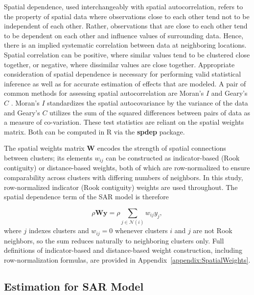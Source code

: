\documentclass{article}[11pt]
\begin{document}
Spatial dependence, used interchangeably with spatial autocorrelation, refers to the property of spatial data where observations close to each other tend not to be independent of each other. Rather, observations that are close to each other tend to be dependent on each other and influence values of surrounding data. Hence, there is an implied systematic correlation between data at neighboring locations. Spatial correlation can be positive, where similar values tend to be clustered close together, or negative, where dissimilar values are close together. Appropriate consideration of spatial dependence is necessary for performing valid statistical inference as well as for accurate estimation of effects that are modeled. A pair of common methods for assessing spatial autocorrelation are Moran's $\textit{I}$ \cite{moran_interpretation_1948}\cite{moran_notes_1950} and Geary's $\textit{C}$ \cite{geary_contiguity_1954}\cite{waller_applied_2004}. Moran's $\textit{I}$ standardizes the spatial autocovariance by the variance of the data and Geary's $\textit{C}$ utilizes the sum of the squared differences between pairs of data as a measure of co-variation. These test statistics are reliant on the spatial weights matrix. Both can be computed in R via the \textbf{spdep} package\cite{bivand_comparing_2018}.


The spatial weights matrix $\mathbf{W}$ encodes the strength of spatial connections between clusters; its elements $w_{ij}$ can be constructed as indicator-based (Rook contiguity) or distance-based weights, both of which are row-normalized to ensure comparability across clusters with differing numbers of neighbors. In this study, row-normalized indicator (Rook contiguity) weights are used throughout. The spatial dependence term of the SAR model is therefore

\begin{equation}\label{Equation:SpatialDepTerm}
    \rho\mathbf{Wy} = \rho\sum_{j \in \mathcal{N}(i)}w_{ij}y_j,
\end{equation}
\noindent where $j$ indexes clusters and $w_{ij} = 0$ whenever clusters $i$ and $j$ are not Rook neighbors, so the sum reduces naturally to neighboring clusters only. Full definitions of indicator-based and distance-based weight construction, including row-normalization formulas, are provided in Appendix~\ref{appendix:SpatialWeights}.

\subsection{Estimation for SAR Model}
\end{document}
